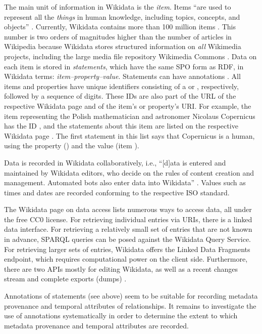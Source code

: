 The main unit of information in Wikidata is the \emph{item}. Items \enquote{are used to represent all the \emph{things} in human knowledge, including topics, concepts, and objects} \autocite{Wikidata_items}.
Currently, Wikidata contains more than 100 million items \autocite{Wikidata_data_access}.
This number is two orders of magnitudes higher than the number of articles in Wikipedia
because Wikidata stores structured information on \emph{all} Wikimedia projects,
including the large media file repository Wikimedia Commons \autocite[cf.][]{Wikidata_items}.
Data on each item is stored in \emph{statements}, which have the same \gls{SPO}
form as \gls{RDF}, in Wikidata terms: \emph{item--property--value}.
Statements can have annotations
\autocite[cf.][]{Wikidata_statements}. All items and properties have unique identifiers
consisting of a  or , respectively, followed by a sequence of digits.
These IDs are also part of the URL of the respective Wikidata page
and of the item's or property's URI.
For example, the item representing the 
Polish mathematician and astronomer Nicolaus Copernicus has the ID ,
and the statements about this item are listed on the respective Wikidata page \autocite[cf.][]{Wikidata_Copernicus}.
The first statement in this list says that Copernicus is a human,
using the property  () and the value 
(item ).

Data is recorded in Wikidata collaboratively,
i.e., \enquote{[d]ata is entered and maintained by Wikidata editors, who decide on the rules of content creation and management. Automated bots also enter data into Wikidata}
\autocite{Wikidata_intro}.
Values such as times and dates are recorded conforming to the respective \gls{ISO} standard.

The Wikidata page on data access \autocite{Wikidata_data_access} lists numerous ways to access data,
all under the free CC0 license.
For retrieving individual entries via URIs, there is a linked data interface.
For retrieving a relatively small set of entries that are not known in advance,
SPARQL queries can be posed against the Wikidata Query Service.
For retrieving larger sets of entries, Wikidata offers the Linked Data Fragments endpoint,
which requires computational power on the client side.
Furthermore, there are two APIs mostly for editing Wikidata,
as well as a recent changes stream and complete exports (dumps)
\autocite[cf.][]{Wikidata_data_access}.

Annotations of statements (see above) seem to be suitable for 
recording metadata provenance and temporal attributes of relationships.
It remains to investigate the use of annotations systematically
in order to determine the extent to which metadata provenance and temporal attributes
are recorded.

